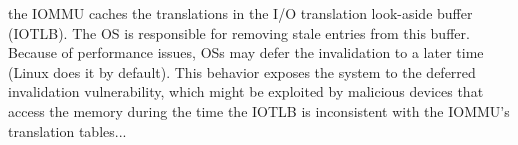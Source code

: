 the IOMMU caches the translations in the I/O translation look-aside buffer (IOTLB). The OS is responsible for removing stale entries from this buffer. Because of performance issues, OSs may defer the invalidation to a later time (Linux does it by default). This behavior exposes the system to the deferred invalidation vulnerability, which might be exploited by malicious devices that access the memory during the time the IOTLB is inconsistent with the IOMMU’s translation tables...
 








%



\appendix



